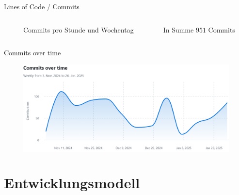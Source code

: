 \documentclass{sdqbeamer}
\begin{document}
\begin{frame}{Lines of Code / Commits}
\begin{columns}
\begin{figure}
            \caption{Commits pro Stunde und Wochentag}
            \label{fig:enter-label}
        \end{figure}
        In Summe $951$ Commits
        \hfill \break
        \hfill \break
        \hfill \break
        \hfill \break
        \end{columns}
      
    \end{frame}
    
    \begin{frame}{Commits over time}
        \begin{figure}
            \centering
            \includegraphics[width=0.8\linewidth]{Commits over time.png}
            \label{fig:enter-label}
        \end{figure}
    \end{frame}
    
    \section{Entwicklungsmodell}
    
\end{document}
